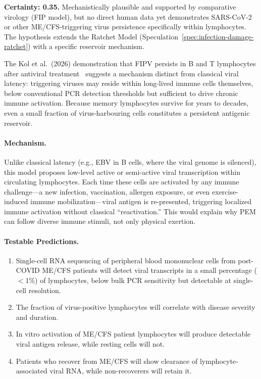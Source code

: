 \begin{hypothesis}
\label{hyp:lymphocyte-reservoir-ratchet}

\textbf{Certainty: 0.35.} Mechanistically plausible and supported by comparative virology (FIP model), but no direct human data yet demonstrates SARS-CoV-2 or other ME/CFS-triggering virus persistence specifically within lymphocytes. The hypothesis extends the Ratchet Model (Speculation~\ref{spec:infection-damage-ratchet}) with a specific reservoir mechanism.

The Kol et al.\ (2026) demonstration that FIPV persists in B and T lymphocytes after antiviral treatment~\cite{Kol2026fipv} suggests a mechanism distinct from classical viral latency: triggering viruses may reside within long-lived immune cells themselves, below conventional PCR detection thresholds but sufficient to drive chronic immune activation. Because memory lymphocytes survive for years to decades, even a small fraction of virus-harbouring cells constitutes a persistent antigenic reservoir.

\paragraph{Mechanism.}
Unlike classical latency (e.g., EBV in B cells, where the viral genome is silenced), this model proposes low-level active or semi-active viral transcription within circulating lymphocytes. Each time these cells are activated by any immune challenge---a new infection, vaccination, allergen exposure, or even exercise-induced immune mobilization---viral antigen is re-presented, triggering localized immune activation without classical ``reactivation.'' This would explain why PEM can follow diverse immune stimuli, not only physical exertion.

\paragraph{Testable Predictions.}
\begin{enumerate}
    \item Single-cell RNA sequencing of peripheral blood mononuclear cells from post-COVID ME/CFS patients will detect viral transcripts in a small percentage ($<$1\%) of lymphocytes, below bulk PCR sensitivity but detectable at single-cell resolution.
    \item The fraction of virus-positive lymphocytes will correlate with disease severity and duration.
    \item In vitro activation of ME/CFS patient lymphocytes will produce detectable viral antigen release, while resting cells will not.
    \item Patients who recover from ME/CFS will show clearance of lymphocyte-associated viral RNA, while non-recoverers will retain it.
\end{enumerate}


\end{hypothesis}
